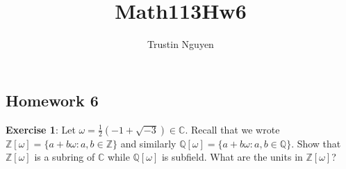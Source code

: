 \documentclass{article}
\title{Math113Hw6}
\author{Trustin Nguyen}
\begin{document}
\maketitle
\reversemarginpar

\begin{topic}
    \section*{Homework 6}
\end{topic}

\textbf{Exercise 1}: Let $\omega = \frac{1}{2}(-1 + \sqrt{-3}) \in \mathbb{C}$. Recall that we wrote $\mathbb{Z}[\omega] = \{a + b\omega : a, b \in \mathbb{Z}\}$ and similarly $\mathbb{Q}[\omega] = \{a + b\omega : a, b \in \mathbb{Q}\}$. Show that $\mathbb{Z}[\omega]$ is a subring of $\mathbb{C}$ while $\mathbb{Q}[\omega]$ is  subfield. What are the units in $\mathbb{Z}[\omega]$?
\end{document}
